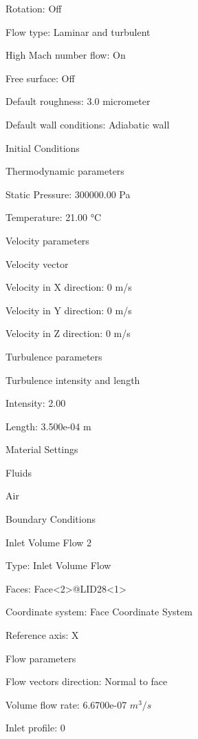                 Rotation:   Off 

                Flow type:   Laminar and turbulent 

                High Mach number flow:   On 

                Free surface:   Off 

                Default roughness:   3.0 micrometer 

                Default wall conditions:   Adiabatic wall 

    Initial Conditions 

            Thermodynamic parameters 

                Static Pressure:   300000.00 Pa 

                Temperature:   21.00 °C 

            Velocity parameters 

                Velocity vector 

                Velocity in X direction:   0 m/s 

                Velocity in Y direction:   0 m/s 

                Velocity in Z direction:   0 m/s 

            Turbulence parameters 

                Turbulence intensity and length 

                Intensity:   2.00 %

                Length:   3.500e-04 m 

    Material Settings 

        Fluids 

                Air 

    Boundary Conditions 

            Inlet Volume Flow 2 

                Type:   Inlet Volume Flow 

                Faces:   Face<2>@LID28<1> 

                Coordinate system:   Face Coordinate System 

                Reference axis:   X 

            Flow parameters 

                Flow vectors direction:   Normal to face 

                Volume flow rate:   6.6700e-07 $m^3/s$ 

                Inlet profile:   0   


